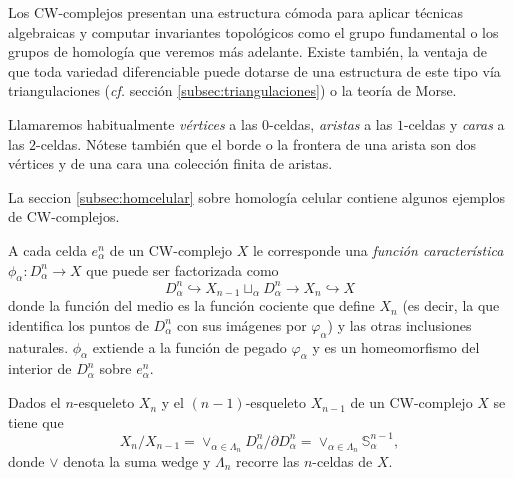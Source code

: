 Los CW-complejos presentan una estructura cómoda para aplicar técnicas algebraicas y computar invariantes topológicos como el grupo fundamental o los grupos de homología que veremos más adelante. Existe también, la ventaja de que toda variedad diferenciable puede dotarse de una estructura de este tipo vía triangulaciones (\textit{cf.} sección \ref{subsec:triangulaciones}) o la teoría de Morse.

\begin{nota}
    Llamaremos habitualmente \textit{vértices} a las $0$-celdas, \textit{aristas} a las $1$-celdas y \textit{caras} a las $2$-celdas. Nótese también que el borde o la frontera de una arista son dos vértices y de una cara una colección finita de aristas.
\end{nota}

La seccion \ref{subsec:homcelular} sobre homología celular contiene algunos ejemplos de CW-complejos.

\medskip

\begin{definition}
    A cada celda $e^n_{\alpha}$ de un CW-complejo $X$ le corresponde una \textit{función característica} $\phi_{\alpha} : D^n_{\alpha}\to X$ que puede ser factorizada como
    \begin{equation*}
        D^n_{\alpha} \hookrightarrow X_{n-1} \sqcup_{\alpha} D^n_{\alpha} \to X_n \hookrightarrow X
    \end{equation*}
    donde la función del medio es la función cociente que define $X_n$ (es decir, la que identifica los puntos de $D^n_{\alpha}$ con sus imágenes por $\varphi_{\alpha}$) y las otras inclusiones naturales. $\phi_{\alpha}$ extiende a la función de pegado $\varphi_{\alpha}$ y es un homeomorfismo del interior de $D^n_{\alpha}$ sobre $e^n_{\alpha}$.

\end{definition}
\bigskip

\begin{proposition}
    Dados el $n$-esqueleto $X_n$ y el $(n-1)$-esqueleto $X_{n-1}$ de un CW-complejo $X$ se tiene que 
    \begin{equation*}
        X_n/X_{n-1} = \vee_{\alpha\in\Lambda_n} D^n_{\alpha}/\partial D^n_{\alpha} = \vee_{\alpha\in\Lambda_n} \mathbb{S}^{n-1}_{\alpha},
    \end{equation*}
    donde $\vee$ denota la suma wedge \cite[p.~10]{hatcher2002} y $\Lambda_n$ recorre las $n$-celdas de $X$.
\end{proposition}

